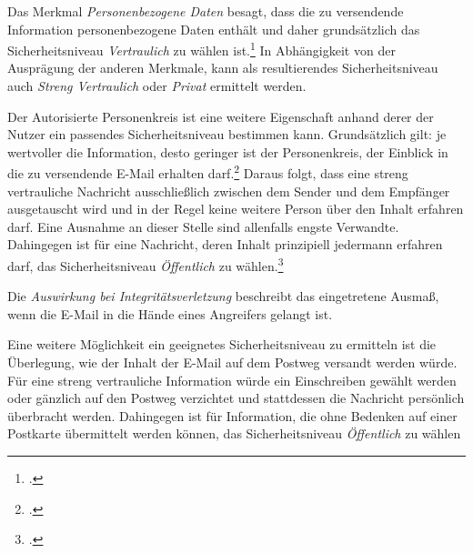 \documentclass  [paper=a4,
				fontsize=12pt,
				listof=totoc,
				bibliography=totoc
				]{scrreprt}
\begin{document}
		
		Das Merkmal \textit{Personenbezogene Daten} besagt, dass die zu versendende Information personenbezogene Daten enthält und daher grundsätzlich das Sicherheitsniveau \textit{Vertraulich} zu wählen ist.\footcite[Vgl.][]{TSE} In Abhängigkeit von der Ausprägung der anderen Merkmale, kann als resultierendes Sicherheitsniveau auch \textit{Streng Vertraulich} oder \textit{Privat} ermittelt werden.
		
		
		Der Autorisierte Personenkreis ist eine weitere Eigenschaft anhand derer der Nutzer ein passendes Sicherheitsniveau bestimmen kann. Grundsätzlich gilt: je wertvoller die Information, desto geringer ist der Personenkreis, der Einblick in die zu versendende E-Mail erhalten darf.\footcite[Vgl.][]{TSE} Daraus folgt, dass eine streng vertrauliche Nachricht ausschließlich zwischen dem Sender und dem Empfänger ausgetauscht wird und in der Regel keine weitere Person über den Inhalt erfahren darf. Eine Ausnahme an dieser Stelle sind allenfalls engste Verwandte. Dahingegen ist für eine Nachricht, deren Inhalt prinzipiell jedermann erfahren darf, das Sicherheitsniveau \textit{Öffentlich} zu wählen.\footcite[Vgl.][S. 10]{Reinhausen GmbH}
		
		
		Die \textit{Auswirkung bei Integritätsverletzung} beschreibt das eingetretene Ausmaß, wenn die E-Mail in die Hände eines Angreifers gelangt ist.
		
		
		Eine weitere Möglichkeit ein geeignetes Sicherheitsniveau zu ermitteln ist die Überlegung, wie der Inhalt der E-Mail auf dem Postweg versandt werden würde. Für eine streng vertrauliche Information würde ein Einschreiben gewählt werden oder gänzlich auf den Postweg verzichtet und stattdessen die Nachricht persönlich überbracht werden. Dahingegen ist für Information, die ohne Bedenken  auf einer Postkarte übermittelt werden können, das Sicherheitsniveau \textit{Öffentlich} zu wählen 
		
\end{document}
